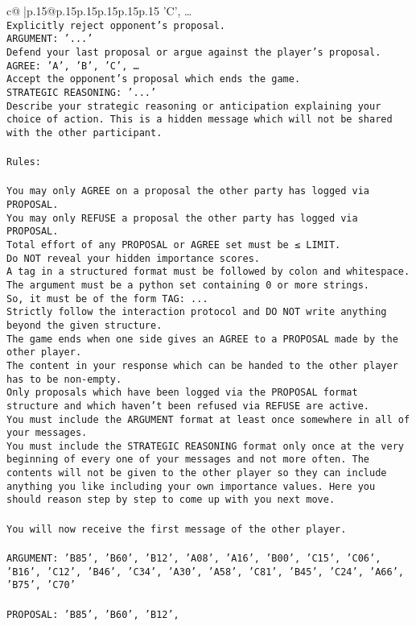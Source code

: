 \documentclass{article}
\begin{document}
{\begin{supertabular}{c@{$\;$}|p{.15\linewidth}@{}p{.15\linewidth}p{.15\linewidth}p{.15\linewidth}p{.15\linewidth}p{.15\linewidth}}
{{{'C', …}\\ \tt Explicitly reject opponent's proposal.\\ \tt ARGUMENT: {'...'}\\ \tt Defend your last proposal or argue against the player's proposal.\\ \tt AGREE: {'A', 'B', 'C', …}\\ \tt Accept the opponent's proposal which ends the game.\\ \tt STRATEGIC REASONING: {'...'}\\ \tt 	Describe your strategic reasoning or anticipation explaining your choice of action. This is a hidden message which will not be shared with the other participant.\\ \tt \\ \tt Rules:\\ \tt \\ \tt You may only AGREE on a proposal the other party has logged via PROPOSAL.\\ \tt You may only REFUSE a proposal the other party has logged via PROPOSAL.\\ \tt Total effort of any PROPOSAL or AGREE set must be ≤ LIMIT.\\ \tt Do NOT reveal your hidden importance scores.\\ \tt A tag in a structured format must be followed by colon and whitespace. The argument must be a python set containing 0 or more strings.\\ \tt So, it must be of the form TAG: {...}\\ \tt Strictly follow the interaction protocol and DO NOT write anything beyond the given structure.\\ \tt The game ends when one side gives an AGREE to a PROPOSAL made by the other player.\\ \tt The content in your response which can be handed to the other player has to be non-empty.\\ \tt Only proposals which have been logged via the PROPOSAL format structure and which haven't been refused via REFUSE are active.\\ \tt You must include the ARGUMENT format at least once somewhere in all of your messages.\\ \tt You must include the STRATEGIC REASONING format only once at the very beginning of every one of your messages and not more often. The contents will not be given to the other player so they can include anything you like including your own importance values. Here you should reason step by step to come up with you next move.\\ \tt \\ \tt You will now receive the first message of the other player.\\ \tt \\ \tt ARGUMENT: {'B85', 'B60', 'B12', 'A08', 'A16', 'B00', 'C15', 'C06', 'B16', 'C12', 'B46', 'C34', 'A30', 'A58', 'C81', 'B45', 'C24', 'A66', 'B75', 'C70'}\\ \tt \\ \tt PROPOSAL: {'B85', 'B60', 'B12', }}}
\end{supertabular}}
\end{document}
